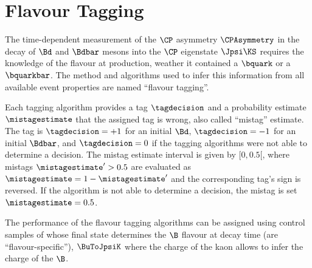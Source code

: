 
\chapter{Flavour Tagging}
\label{ch:flavour_tagging}

The time-dependent measurement of the $\CP$ asymmetry $\CPAsymmetry$ in the
decay of $\Bd$ and $\Bdbar$ mesons into the $\CP$ eigenstate $\Jpsi\KS$ requires
the knowledge of the \Bmeson flavour at production, \ie weather it contained
a $\bquark$ or a $\bquarkbar$. The method and algorithms used to infer this
information from all available event properties are named \enquote{flavour
tagging}.

Each tagging algorithm provides a tag $\tagdecision$ and a probability estimate
$\mistagestimate$ that the assigned tag is wrong, also called \enquote{mistag}
estimate. The tag is $\tagdecision=+1$ for an initial $\Bd$, $\tagdecision=-1$
for an initial $\Bdbar$, and $\tagdecision=0$ if the tagging algorithms were not
able to determine a decision. The mistag estimate interval is given by
$[0,0.5[$, where mistags $\mistagestimate^{\prime}>0.5$ are evaluated as
$\mistagestimate = 1 - \mistagestimate^{\prime}$ and the corresponding tag's
sign is reversed. If the algorithm is not able to determine a decision, the
mistag is set $\mistagestimate=0.5$.

The performance of the flavour tagging algorithms can be assigned using control
samples of \Bmesons whose final state determines the $\B$ flavour at decay
time (\ie are \enquote{flavour-specific}), \eg $\BuToJpsiK$ where the charge of
the kaon allows to infer the charge of the $\B$.

